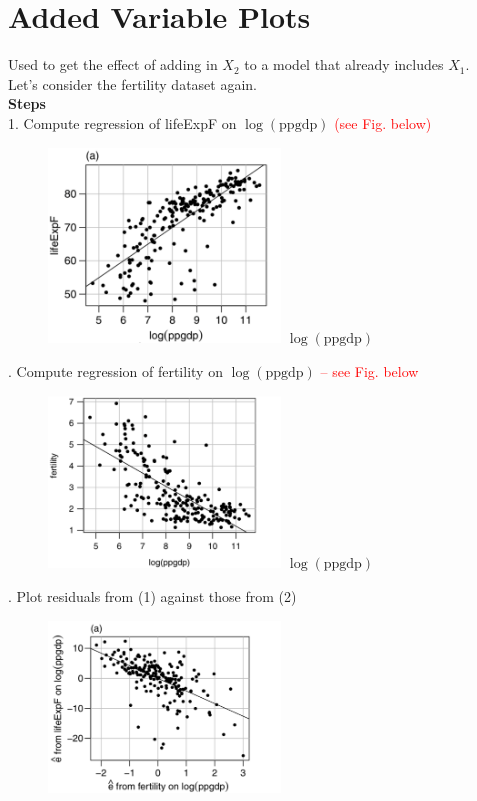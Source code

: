 \documentclass[14pt]{extarticle}
\begin{document}
\section*{Added Variable Plots}
Used to get the effect of adding in $X_2$ to a model that already includes $X_1$.\\
Let's consider the fertility dataset again.\\
\textbf{Steps}\\
1. Compute regression of lifeExpF on $\log(\text{ppgdp})$ \textcolor{red}{(see Fig. below)}
\begin{figure}[H]
    \centering
    \includegraphics[width=0.55\textwidth]{fig3.png}
    $\log(\text{ppgdp})$ \text{)}
\end{figure}
. Compute regression of fertility on $\log(\text{ppgdp})$ \textcolor{red}{-- see Fig. below}
\begin{figure}[H]
    \centering
    \includegraphics[width=0.55\textwidth]{fig4.png}
    $\log(\text{ppgdp})$ \text{)}
\end{figure}
. Plot residuals from (1) against those from (2)
\begin{figure}[H]
    \centering
    \includegraphics[width=0.55\textwidth]{fig5.png}
\end{figure}
\end{document}
